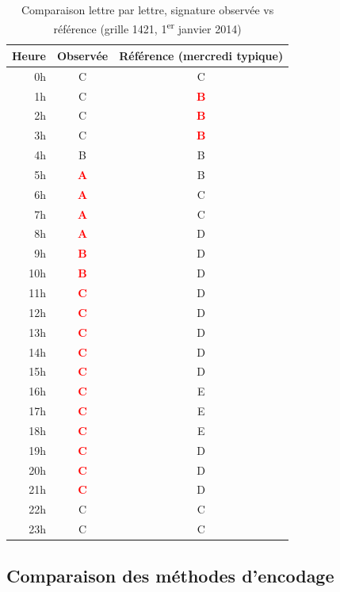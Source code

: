 \begin{table}[htbp]
  \centering
  \caption{Comparaison lettre par lettre, signature observée vs référence (grille 1421, 1\textsuperscript{er} janvier 2014)}
  \label{tab:dna-example}
  \small
  \begin{tabular}{r c c}
    \toprule
    \textbf{Heure} & \textbf{Observée} & \textbf{Référence (mercredi typique)} \\
    \midrule
    0h  & C & C \\
    1h  & C & \textcolor{red}{\textbf{B}} \\
    2h  & C & \textcolor{red}{\textbf{B}} \\
    3h  & C & \textcolor{red}{\textbf{B}} \\
    4h  & B & B \\
    5h  & \textcolor{red}{\textbf{A}} & B \\
    6h  & \textcolor{red}{\textbf{A}} & C \\
    7h  & \textcolor{red}{\textbf{A}} & C \\
    8h  & \textcolor{red}{\textbf{A}} & D \\
    9h  & \textcolor{red}{\textbf{B}} & D \\
    10h & \textcolor{red}{\textbf{B}} & D \\
    11h & \textcolor{red}{\textbf{C}} & D \\
    12h & \textcolor{red}{\textbf{C}} & D \\
    13h & \textcolor{red}{\textbf{C}} & D \\
    14h & \textcolor{red}{\textbf{C}} & D \\
    15h & \textcolor{red}{\textbf{C}} & D \\
    16h & \textcolor{red}{\textbf{C}} & E \\
    17h & \textcolor{red}{\textbf{C}} & E \\
    18h & \textcolor{red}{\textbf{C}} & E \\
    19h & \textcolor{red}{\textbf{C}} & D \\
    20h & \textcolor{red}{\textbf{C}} & D \\
    21h & \textcolor{red}{\textbf{C}} & D \\
    22h & C & C \\
    23h & C & C \\
    \bottomrule
  \end{tabular}
\end{table}

\subsection{Comparaison des méthodes d'encodage}
\label{sec:comparaison-encodage}


